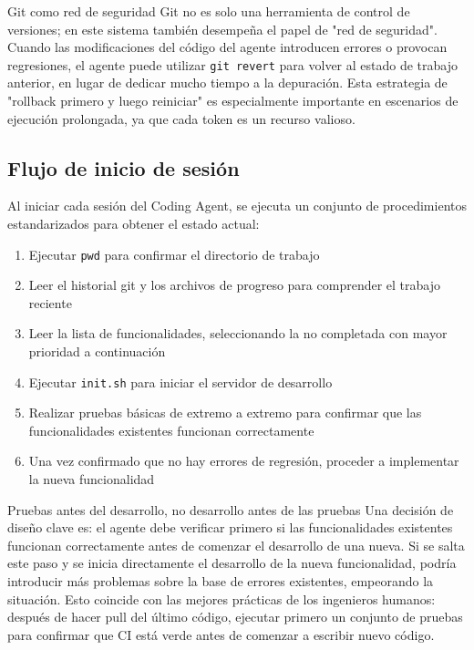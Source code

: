 \begin{knowledgebox}{Git como red de seguridad}
Git no es solo una herramienta de control de versiones; en este sistema también desempeña el papel de "red de seguridad". Cuando las modificaciones del código del agente introducen errores o provocan regresiones, el agente puede utilizar \texttt{git revert} para volver al estado de trabajo anterior, en lugar de dedicar mucho tiempo a la depuración. Esta estrategia de "rollback primero y luego reiniciar" es especialmente importante en escenarios de ejecución prolongada, ya que cada token es un recurso valioso.
\end{knowledgebox}

\subsection{Flujo de inicio de sesión}

Al iniciar cada sesión del Coding Agent, se ejecuta un conjunto de procedimientos estandarizados para obtener el estado actual:

\begin{enumerate}
    \item Ejecutar \texttt{pwd} para confirmar el directorio de trabajo
    \item Leer el historial git y los archivos de progreso para comprender el trabajo reciente
    \item Leer la lista de funcionalidades, seleccionando la no completada con mayor prioridad a continuación
    \item Ejecutar \texttt{init.sh} para iniciar el servidor de desarrollo
    \item Realizar pruebas básicas de extremo a extremo para confirmar que las funcionalidades existentes funcionan correctamente
    \item Una vez confirmado que no hay errores de regresión, proceder a implementar la nueva funcionalidad
\end{enumerate}

\begin{warningbox}{Pruebas antes del desarrollo, no desarrollo antes de las pruebas}
Una decisión de diseño clave es: el agente debe verificar primero si las funcionalidades existentes funcionan correctamente antes de comenzar el desarrollo de una nueva. Si se salta este paso y se inicia directamente el desarrollo de la nueva funcionalidad, podría introducir más problemas sobre la base de errores existentes, empeorando la situación. Esto coincide con las mejores prácticas de los ingenieros humanos: después de hacer pull del último código, ejecutar primero un conjunto de pruebas para confirmar que CI está verde antes de comenzar a escribir nuevo código.
\end{warningbox}

